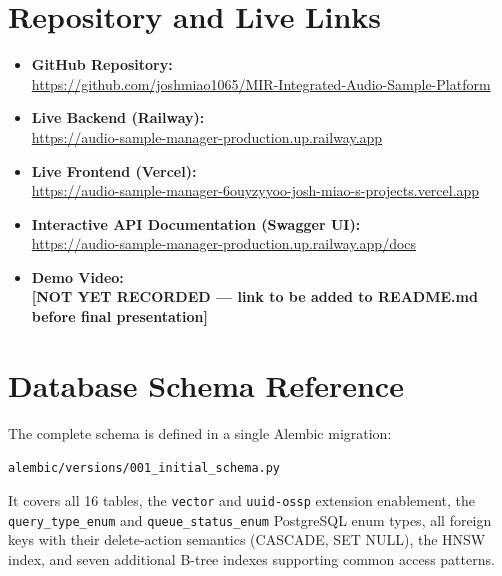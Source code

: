 \documentclass[12pt,letterpaper]{report}
\begin{document}
\appendix
\chapter{Repository and Live Links}

\begin{itemize}
  \item \textbf{GitHub Repository:}\\
    \url{https://github.com/joshmiao1065/MIR-Integrated-Audio-Sample-Platform}
  \item \textbf{Live Backend (Railway):}\\
    \url{https://audio-sample-manager-production.up.railway.app}
  \item \textbf{Live Frontend (Vercel):}\\
    \url{https://audio-sample-manager-6ouyzyyoo-josh-miao-s-projects.vercel.app}
  \item \textbf{Interactive API Documentation (Swagger UI):}\\
    \url{https://audio-sample-manager-production.up.railway.app/docs}
  \item \textbf{Demo Video:}\\
    \textbf{[NOT YET RECORDED --- link to be added to README.md before final presentation]}
\end{itemize}

\chapter{Database Schema Reference}

The complete schema is defined in a single Alembic migration:

\begin{center}
\texttt{alembic/versions/001\_initial\_schema.py}
\end{center}

It covers all 16 tables, the \texttt{vector} and \texttt{uuid-ossp} extension enablement, the \texttt{query\_type\_enum} and \texttt{queue\_status\_enum} PostgreSQL enum types, all foreign keys with their delete-action semantics (CASCADE, SET NULL), the HNSW index, and seven additional B-tree indexes supporting common access patterns.
\end{document}
